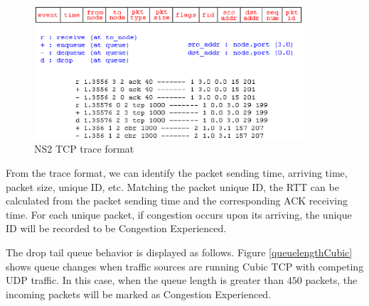\begin{figure}
\centering
\includegraphics[width=10cm]{format.eps}
\caption{NS2 TCP trace format}
\label{NS2Format}
\end{figure}
From the trace format, we can identify the packet sending time, arriving time, packet size, unique ID, etc. Matching the packet unique ID, the RTT can be calculated from the packet sending time and the corresponding ACK receiving time. For each unique packet, if congestion occurs upon its arriving, the unique ID will be recorded to be Congestion Experienced.

\par The drop tail queue behavior is displayed as follows.
Figure \ref{queuelengthCubic} shows queue changes when traffic sources are running Cubic TCP with competing UDP traffic. 
In this case, when the queue length is greater than $450$ packets, the incoming packets will be marked as Congestion Experienced.


